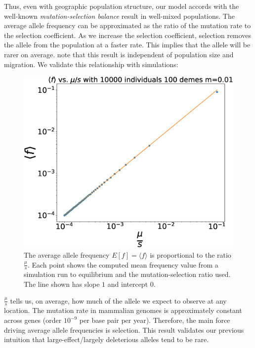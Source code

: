 Thus, even with geographic population structure, our model accords with the well-known \textit{mutation-selection balance} result \cite{fisher_genetical_1930} in well-mixed populations. The average allele frequency can be approximated as the ratio of the mutation rate to the selection coefficient. As we increase the selection coefficient, selection removes the allele from the population at a faster rate. This implies that the allele will be rarer on average. note that this result is independent of population size and migration. We validate this relationship with simulations:

\begin{figure}[h]
    \centering
    \includegraphics[scale=0.4]{img/fig1.eps}
    \caption{The average allele frequency $E[f] = \langle f \rangle$ is proportional to the ratio $\frac{\mu}{s}$. Each point shows the computed mean frequency value from a simulation run to equilibrium and the mutation-selection ratio used. The line shown has slope $1$ and intercept $0$. }
    \label{fig:avg_freq}
\end{figure}

$\frac{\mu}{s}$ tells us, on average, how much of the allele we expect to observe at any location. The mutation rate in mammalian genomes is approximately constant across genes (order $10^{-9}$ per base pair per year). \cite{kumar_mutation_2002} \cite{scally_mutation_2016} Therefore, the main force driving average allele frequencies is selection. This result validates our previous intuition that large-effect/largely deleterious alleles tend to be rare.

